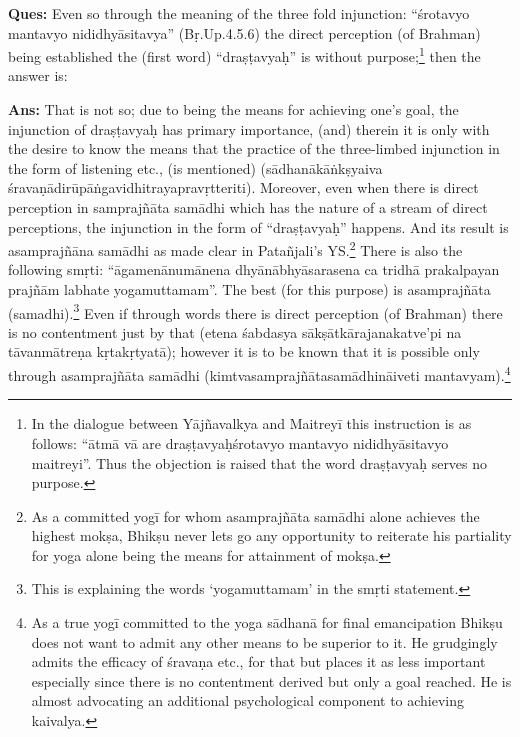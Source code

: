 \textbf{Ques:} Even so through the meaning of the three fold injunction: “śrotavyo mantavyo nididhyāsitavya” (Bṛ.Up.4.5.6) the direct perception (of Brahman) being established  the (first word) “draṣṭavyaḥ” is without purpose;\footnote{In the dialogue between Yājñavalkya and Maitreyī this instruction is as follows: “ātmā vā are draṣṭavyaḥśrotavyo mantavyo nididhyāsitavyo maitreyi”. Thus the objection is raised that the word draṣṭavyaḥ serves no purpose.} then the answer is:

\textbf{Ans:} That is not so; due to being the means for achieving one’s goal, the injunction of draṣṭavyaḥ has primary importance, (and) therein it is only with the desire to know the means that the practice of the three-limbed injunction in the form of listening etc., (is mentioned) (sādhanākāṅkṣyaiva śravaṇādirūpāṅgavidhitrayapravṛtteriti). Moreover, even when there is direct perception in samprajñāta samādhi which has the nature of a stream of direct perceptions, the injunction in the form of “draṣṭavyaḥ” happens. And its result is asamprajñāna samādhi as made clear in  Patañjali’s YS.\footnote{As a committed yogī for whom asamprajñāta samādhi alone achieves the highest mokṣa, Bhikṣu never lets go any opportunity to reiterate his partiality for yoga alone being the means for attainment of mokṣa.} There is also the following smṛti: “āgamenānumānena   dhyānābhyāsarasena ca tridhā prakal\-payan prajñām labhate yogamuttamam”. The best (for this purpose) is asamprajñāta (samadhi).\footnote{This is explaining the words ‘yogamuttamam’ in the smṛti statement.} Even if through words there is direct perception (of Brahman) there is no contentment just by that (etena śabdasya sākṣātkārajanakatve’pi na tāvanmātreṇa kṛtakṛtyatā); however it is to be known that it is possible only through asamprajñāta samādhi (kimtvasamprajñātasamādhināiveti mantavyam).\footnote{As a true yogī committed to the yoga sādhanā for final emancipation Bhikṣu does not want to admit any other means to be superior to it. He grudgingly admits the efficacy of śravaṇa etc., for that but places it as less important especially since there is no contentment derived but only a goal reached. He is almost advocating an additional psychological component to achieving kaivalya.}


